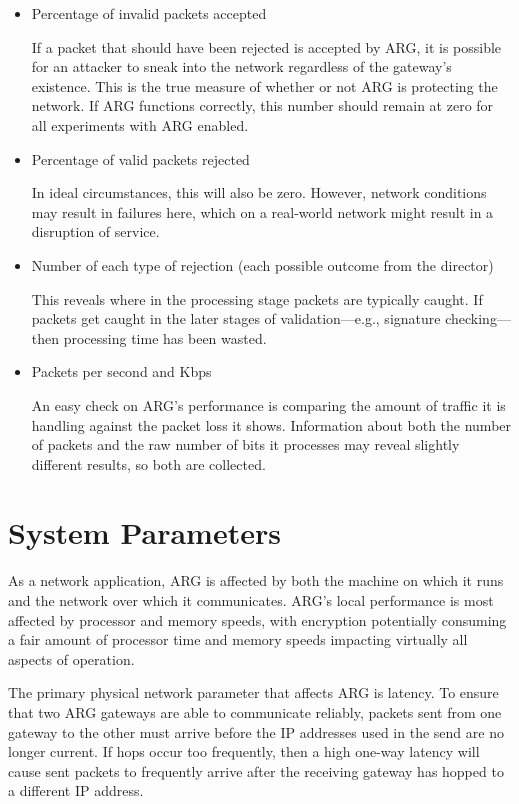 \begin{itemize}
\item Percentage of invalid packets accepted
	\par If a packet that should have been rejected is accepted by \ac{ARG}, it is possible for an attacker to sneak into the network regardless of the gateway's existence. This is the true measure of whether or not \ac{ARG} is protecting the network. If \ac{ARG} functions correctly, this number should remain at zero for all experiments with \ac{ARG} enabled.

\item Percentage of valid packets rejected
	\par In ideal circumstances, this will also be zero. However, network conditions may result in failures here, which on a real-world network might result in a disruption of service. 

\item Number of each type of rejection (each possible outcome from the director)
	\par This reveals where in the processing stage packets are typically caught. If packets get caught in the later stages of validation---e.g., signature checking---then processing time has been wasted.

\item Packets per second and \acf{Kbps}
	\par An easy check on \ac{ARG}'s performance is comparing the amount of traffic it is handling against the packet loss it shows. Information about both the number of packets and the raw number of bits it processes may reveal slightly different results, so both are collected.
\end{itemize}

\section{System Parameters}
\label{sec:parameters}
\par As a network application, \ac{ARG} is affected by both the machine on which it runs and the network over which it communicates. \ac{ARG}'s local performance is most affected by processor and memory speeds, with encryption potentially consuming a fair amount of processor time and memory speeds impacting virtually all aspects of operation.

\par The primary physical network parameter that affects \ac{ARG} is latency. To ensure that two \ac{ARG} gateways are able to communicate reliably, packets sent from one gateway to the other must arrive before the \ac{IP} addresses used in the send are no longer current. If hops occur too frequently, then a high one-way latency will cause sent packets to frequently arrive after the receiving gateway has hopped to a different \ac{IP} address. 

